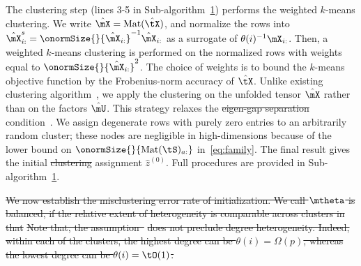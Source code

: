 \documentclass[lettersize,onecolumn,journal]{IEEEtran}
\theoremstyle{definition}
\theoremstyle{definition}
\providecommand{\DIFaddtex}[1]{{\protect\color{blue}\uwave{#1}}} %
\providecommand{\DIFdeltex}[1]{{\protect\color{red}\sout{#1}}}                      %
\providecommand{\DIFaddbegin}{} %
\providecommand{\DIFaddend}{} %
\providecommand{\DIFdelbegin}{} %
\providecommand{\DIFdelend}{} %
\providecommand{\DIFadd}[1]{\texorpdfstring{\DIFaddtex{#1}}{#1}} %
\providecommand{\DIFdel}[1]{\texorpdfstring{\DIFdeltex{#1}}{}} %
\newcommand{\DIFscaledelfig}{0.5}
\newlength{\DIFdelgraphicswidth} %
\newlength{\DIFdelgraphicsheight} %
\newcommand{\DIFaddincludegraphics}[2][]{{\color{blue}\fbox{\DIFOincludegraphics[#1]{#2}}}} %
\newcommand{\DIFdelincludegraphics}[2][]{%
\sbox{\DIFdelgraphicsbox}{\DIFOincludegraphics[#1]{#2}}%
\settoboxwidth{\DIFdelgraphicswidth}{\DIFdelgraphicsbox} %
\settoboxtotalheight{\DIFdelgraphicsheight}{\DIFdelgraphicsbox} %
\scalebox{\DIFscaledelfig}{%
\parbox[b]{\DIFdelgraphicswidth}{\usebox{\DIFdelgraphicsbox}\\[-\baselineskip] \rule{\DIFdelgraphicswidth}{0em}}\llap{\resizebox{\DIFdelgraphicswidth}{\DIFdelgraphicsheight}{%
\setlength{\unitlength}{\DIFdelgraphicswidth}%
\begin{picture}(1,1)%
\thicklines\linethickness{2pt} %
{\color[rgb]{1,0,0}\put(0,0){\framebox(1,1){}}}%
{\color[rgb]{1,0,0}\put(0,0){\line( 1,1){1}}}%
{\color[rgb]{1,0,0}\put(0,1){\line(1,-1){1}}}%
\end{picture}%
}\hspace*{3pt}}} %
} %
\DeclareRobustCommand{\DIFaddbegin}{\DIFOaddbegin \let\includegraphics\DIFaddincludegraphics} %
\DeclareRobustCommand{\DIFaddend}{\DIFOaddend \let\includegraphics\DIFOincludegraphics} %
\DeclareRobustCommand{\DIFdelbegin}{\DIFOdelbegin \let\includegraphics\DIFdelincludegraphics} %
\DeclareRobustCommand{\DIFdelend}{\DIFOaddend \let\includegraphics\DIFOincludegraphics} %
\begin{document}
\DIFdelbegin %

\DIFdelend The clustering step (lines 3-5 in Sub-algorithm~\hyperref[alg:main]{1}) performs the weighted $k$-means clustering. 
\DIFdelbegin %
\DIFdelend We write $\hat \mX=\text{Mat}(\hat \tX)$, and normalize the rows into $\hat \mX^s_{i:}=\onormSize{}{\hat \mX_{i:}}^{-1}\hat \mX_{i:}$ as a surrogate of $\theta(i)^{-1} \mX_{i:}$. Then, a weighted $k$-means clustering is performed on the normalized rows with weights equal to $\onormSize{}{\hat \mX_{i:}}^2$. \DIFdelbegin %
\DIFdelend The choice of weights is to bound the $k$-means objective function by the Frobenius-norm accuracy of $\hat \tX$. Unlike existing clustering algorithm~\citep{ke2019community}, we apply the clustering on the unfolded tensor $\hat \mX$ rather than on the factors $\hat \mU$. This strategy relaxes the \DIFdelbegin \DIFdel{eigen-gap separation }\DIFdelend \DIFaddbegin \DIFadd{singular-value gap }\DIFaddend condition~\citep{gao2018community, han2020exact}.
\DIFdelbegin %
\DIFdelend We assign degenerate rows with purely zero entries to an arbitrarily random cluster; these nodes are negligible in high-dimensions because of the lower bound on $\onormSize{}{\text{Mat}(\tS)_{a:}}$ in~\eqref{eq:family}. The final result gives the initial \DIFdelbegin \DIFdel{clustering }\DIFdelend \DIFaddbegin \DIFadd{cluster }\DIFaddend assignment $\hat z^{(0)}$. \DIFdelbegin %
\DIFdelend Full procedures are provided in Sub-algorithm~\hyperref[alg:main]{1}. 



\DIFdelbegin \DIFdel{We now establish the misclustering error rate of initialization. We call $\mtheta$ is balanced, if the relative extent of heterogeneity is comparable across clusters in that
}%
\DIFdel{Note that, the assumption~}%
\DIFdel{does not preclude degree heterogeneity. Indeed, within each of the clusters, the highest degree can be $\theta(i) = \Omega(p)$, whereas the lowest degree can be $\theta(i)=\tO(1)$. 
}%
\end{document}
